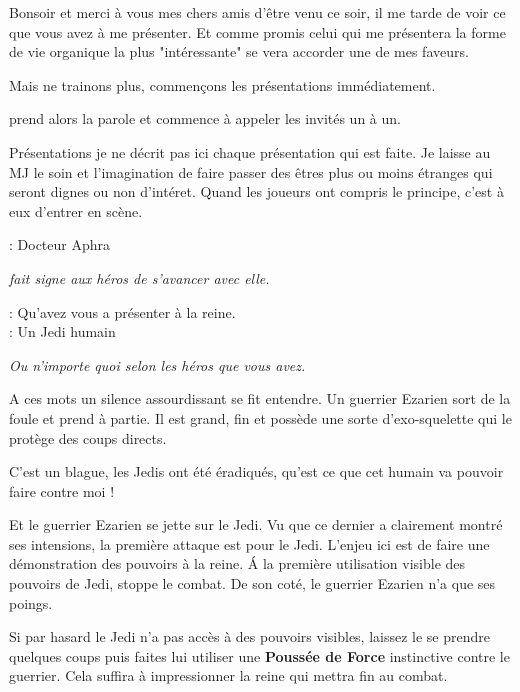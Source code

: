 \begin{quotebox}
Bonsoir et merci à vous mes chers amis d’être venu ce soir, il me tarde de voir ce que vous avez à me présenter. Et comme promis celui qui me présentera la forme de vie organique la plus "intéressante" se vera accorder une de mes faveurs.

Mais ne trainons plus, commençons les présentations immédiatement.
\end{quotebox}

 prend alors la parole et commence à appeler les invités un à un.

\begin{paperbox}{Présentations}
je ne décrit pas ici chaque présentation qui est faite. Je laisse au MJ le soin et l’imagination de faire passer des êtres plus ou moins étranges qui seront dignes ou non d’intéret. Quand les joueurs ont compris le principe, c’est à eux d’entrer en scène.
\end{paperbox}

\begin{quotebox}
\noindent\textbf{}: Docteur Aphra

\emph{ fait signe aux héros de s’avancer avec elle.}

\noindent\textbf{}: Qu’avez vous a présenter à la reine.\\
\noindent\textbf{}: Un Jedi humain

\emph{Ou n’importe quoi selon les héros que vous avez.}
\end{quotebox}

A ces mots un silence assourdissant se fit entendre. Un guerrier Ezarien sort de la foule et prend  à partie. Il est grand, fin et possède une sorte d’exo-squelette qui le protège des coups directs.

\begin{quotebox}
C’est un blague, les Jedis ont été éradiqués, qu’est ce que cet humain va pouvoir faire contre moi !
\end{quotebox}

Et le guerrier Ezarien se jette sur le Jedi. Vu que ce dernier a clairement montré ses intensions, la première attaque est pour le Jedi. L’enjeu ici est de faire une démonstration des pouvoirs à la reine. \'A la première utilisation visible des pouvoirs de Jedi,  stoppe le combat. De son coté, le guerrier Ezarien n’a que ses poings.

Si par hasard le Jedi n’a pas accès à des pouvoirs visibles, laissez le se prendre quelques coups puis faites lui utiliser une \textbf{Poussée de Force} instinctive contre le guerrier. Cela suffira à impressionner la reine qui mettra fin au combat.

